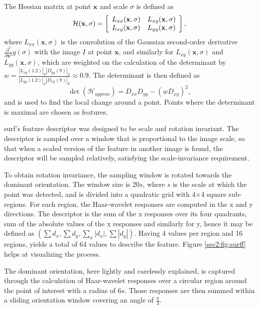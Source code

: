 The Hessian matrix at point $\mathbf{x}$ and scale $\sigma$ is defined as
\begin{equation}
\label{sec2:eq:hessian}
\mathcal { H } ( \mathbf{x} , \sigma ) = \left[ \begin{array} { l l } { L _ { x x } ( \mathbf{x} , \sigma ) } & { L _ { x y } ( \mathbf{x} , \sigma ) } \\ { L _ { x y } ( \mathbf{x} , \sigma ) } & { L _ { y y } ( \mathbf{x} , \sigma ) } \end{array} \right],
\end{equation}
where $L_{xx}(\mathbf{x}, \sigma)$ is the convolution of the Gaussian second-order derivative $\frac { \partial ^ { 2 } } { \partial \mathbf{x} ^ { 2 } } g ( \sigma )$ with the image $I$ at point $\mathbf{x}$, and similarly for $L_{xy}(\mathbf{x}, \sigma)$ and $L_{yy}(\mathbf{x}, \sigma)$, which are weighted on the calculation of the determinant by $w = \frac { \left| L _ { x y } ( 1.2 ) \right| _ { F } \left| D _ { y y } ( 9 ) \right| _ { F } } { \left| L _ { y y } ( 1.2 ) \right| _ { F } \left| D _ { x y } ( 9 ) \right| _ { F } } \approx 0.9$.
The determinant is then defined as 
\begin{equation}
\label{sec2:eq:det}
\operatorname { det } \left( \mathcal { H } _ { a p p r o x } \right) = D _ { x x } D _ { y y } - \left( w D _ { x y } \right) ^ { 2 },
\end{equation}
and is used to find the local change around a point. Points where the determinant is maximal are chosen as features. 

\acrshort{surf}'s feature descriptor was designed to be scale and rotation invariant. The descriptor is sampled over a window that is proportional to the image scale, so that when a scaled version of the feature in another image is found, the descriptor will be sampled relatively, satisfying the scale-invariance requirement.

To obtain rotation invariance, the sampling window is rotated towards the dominant orientation. The window size is 20$s$, where $s$ is the scale at which the point was detected, and is divided into a quadratic grid with 4$\times$4 square sub-regions. For each region, the Haar-wavelet responses are computed in the x and y directions. The descriptor is the sum of the x responses over its four quadrants, sum of the absolute values of the x responses and similarly for y, hence it may be defined as $\left( \sum d _ { x } , \sum d _ { y } , \sum _ { x } \left| d _ { x } \right| , \sum \left| d _ { y } \right| \right)$. Having 4 values per region and 16 regions, yields a total of 64 values to describe the feature. Figure \ref{sec2:fig:surff} helps at visualizing the process.

The dominant orientation, here lightly and carelessly explained, is captured through the calculation of Haar-wavelet responses over a circular region around the point of interest with a radius of 6$s$. Those responses are then summed within a sliding orientation window covering an angle of $\frac{\pi}{3}$. \cite{surf} \cite{compsiftsurf}
